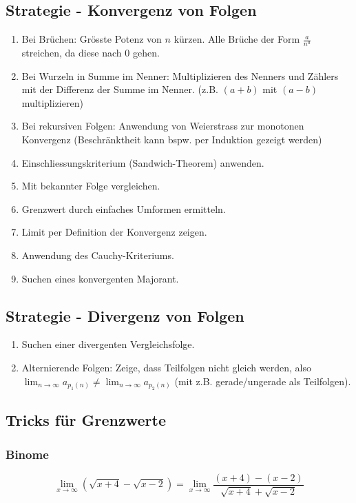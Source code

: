 \documentclass[a4paper,10pt]{article}
\def\limn{\lim_{n\to \infty}}
\begin{document}
\subsection{Strategie - Konvergenz von Folgen}
\begin{enumerate}
 \item Bei Brüchen: Grösste Potenz von $n$ kürzen. Alle Brüche der Form $\frac{a}{n^a}$ streichen, da diese nach 0 gehen.
 \item Bei Wurzeln in Summe im Nenner: Multiplizieren des Nenners und Zählers mit der Differenz der Summe im Nenner. (z.B. $(a+b)$ mit $(a-b)$ multiplizieren)
 \item Bei rekursiven Folgen: Anwendung von Weierstrass zur monotonen Konvergenz (Beschränktheit kann bspw. per Induktion gezeigt werden)
 \item Einschliessungskriterium (Sandwich-Theorem) anwenden.
 \item Mit bekannter Folge vergleichen.
 \item Grenzwert durch einfaches Umformen ermitteln.
 \item Limit per Definition der Konvergenz zeigen.
 \item Anwendung des Cauchy-Kriteriums.
 \item Suchen eines konvergenten Majorant.
\end{enumerate}

\subsection{Strategie - Divergenz von Folgen}
\begin{enumerate}
 \item Suchen einer divergenten Vergleichsfolge.
 \item Alternierende Folgen: Zeige, dass Teilfolgen nicht gleich werden, also $\limn a_{p_1(n)} \ne \limn a_{p_2(n)}$ (mit z.B. gerade/ungerade als Teilfolgen).
\end{enumerate}

\subsection{Tricks für Grenzwerte}
\subsubsection{Binome}
$$\lim_{x\to\infty} (\sqrt{x + 4} - \sqrt{x - 2}) = \lim_{x\to\infty} \frac{(x+4)-(x-2)}{\sqrt{x+4}+\sqrt{x-2}}$$
\end{document}
